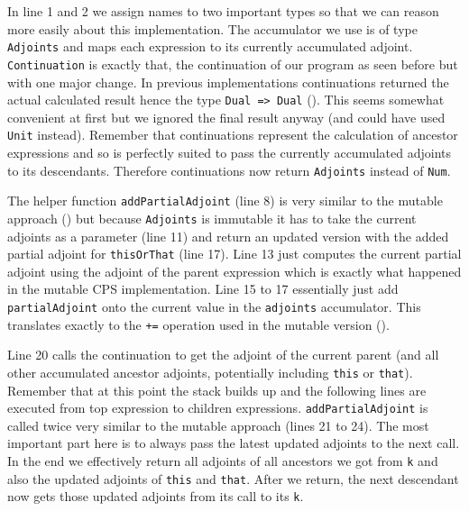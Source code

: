 In line 1 and 2 we assign names to two important types so that we can reason more easily about this implementation. The accumulator we use is of type \lstinline{Adjoints} and maps each expression to its currently accumulated adjoint. \lstinline{Continuation} is exactly that, the continuation of our program as seen before but with one major change. In previous implementations continuations returned the actual calculated result hence the type \lstinline{Dual => Dual} (). This seems somewhat convenient at first but we ignored the final result anyway (and could have used \lstinline{Unit} instead). Remember that continuations represent the calculation of ancestor expressions and so is perfectly suited to pass the currently accumulated adjoints to its descendants. Therefore continuations now return \lstinline{Adjoints} instead of \lstinline{Num}. 

The helper function \lstinline{addPartialAdjoint} (line 8) is very similar to the mutable approach () but because \lstinline{Adjoints} is immutable it has to take the current adjoints as a parameter (line 11) and return an updated version with the added partial adjoint for \lstinline{thisOrThat} (line 17). Line 13 just computes the current partial adjoint using the adjoint of the parent expression which is exactly what happened in the mutable CPS implementation. Line 15 to 17 essentially just add \lstinline{partialAdjoint} onto the current value in the \lstinline{adjoints} accumulator. This translates exactly to the \lstinline{+=} operation used in the mutable version ().

Line 20 calls the continuation to get the adjoint of the current parent (and all other accumulated ancestor adjoints, potentially including \lstinline{this} or \lstinline{that}). Remember that at this point the stack builds up and the following lines are executed from top expression to children expressions. \lstinline{addPartialAdjoint} is called twice very similar to the mutable approach (lines 21 to 24). The most important part here is to always pass the latest updated adjoints to the next call. In the end we effectively return all adjoints of all ancestors we got from \lstinline{k} and also the updated adjoints of \lstinline{this} and \lstinline{that}. After we return, the next descendant now gets those updated adjoints from its call to its \lstinline{k}.


